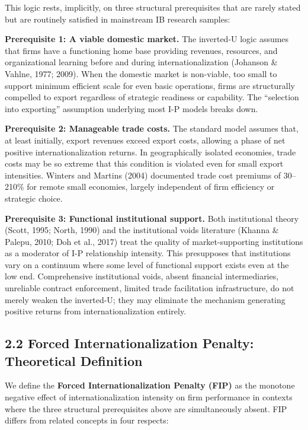 \documentclass[
  12pt]{article}
\begin{document}
This logic rests, implicitly, on three structural prerequisites that are
rarely stated but are routinely satisfied in mainstream IB research
samples:

\textbf{Prerequisite 1: A viable domestic market.} The inverted-U logic
assumes that firms have a functioning home base providing revenues,
resources, and organizational learning before and during
internationalization (Johanson \& Vahlne, 1977; 2009). When the domestic
market is non-viable, too small to support minimum efficient scale for
even basic operations, firms are structurally compelled to export
regardless of strategic readiness or capability. The ``selection into
exporting'' assumption underlying most I-P models breaks down.

\textbf{Prerequisite 2: Manageable trade costs.} The standard model
assumes that, at least initially, export revenues exceed export costs,
allowing a phase of net positive internationalization returns. In
geographically isolated economies, trade costs may be so extreme that
this condition is violated even for small export intensities. Winters
and Martins (2004) documented trade cost premiums of 30--210\% for
remote small economies, largely independent of firm efficiency or
strategic choice.

\textbf{Prerequisite 3: Functional institutional support.} Both
institutional theory (Scott, 1995; North, 1990) and the institutional
voids literature (Khanna \& Palepu, 2010; Doh et al., 2017) treat the
quality of market-supporting institutions as a moderator of I-P
relationship intensity. This presupposes that institutions vary on a
continuum where some level of functional support exists even at the low
end. Comprehensive institutional voids, absent financial intermediaries,
unreliable contract enforcement, limited trade facilitation
infrastructure, do not merely weaken the inverted-U; they may eliminate
the mechanism generating positive returns from internationalization
entirely.

\hypertarget{forced-internationalization-penalty-theoretical-definition}{%
\subsection{2.2 Forced Internationalization Penalty: Theoretical
Definition}\label{forced-internationalization-penalty-theoretical-definition}}

We define the \textbf{Forced Internationalization Penalty (FIP)} as the
monotone negative effect of internationalization intensity on firm
performance in contexts where the three structural prerequisites above
are simultaneously absent. FIP differs from related concepts in four
respects:
\end{document}
